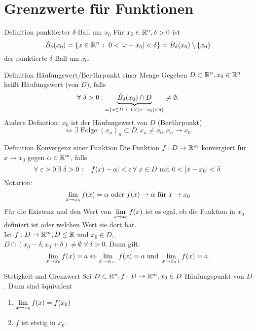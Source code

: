 \documentclass[main.tex]{subfiles}
\begin{document}
\section*{Grenzwerte für Funktionen}
\begin{karte}{Definition punktierter \(\delta\)-Ball um \(x_0\)}
    Für \( x_0 \in \mathbb{R}^n, \delta > 0 \) ist
    \[ \dot{B}_\delta(x_0) = \{ x \in \mathbb{R}^n \;\colon \; 
    0 < \left| x-x_0 \right| < \delta \} = B_\delta (x_0) \setminus 
    \{x_0\} \]
    der punktierte \( \delta \)-Ball um \( x_0 \).
\end{karte}
\begin{karte}{Definition Häufungswert/Berührpunkt einer Menge}
    Gegeben \( D \subset \mathbb{R}^n, x_0 \in \mathbb{R}^n \) heißt 
    Häufungswert (von \( D \)), falls 
    \[ \forall \, \delta > 0 : \underbrace{ 
    \dot{B}_\delta(x_0) \cap D}_{ = \set{ x\in D \;\colon \;
    0 < \abs{ x - x_0 } < \delta } } \neq \emptyset. \]
    Andere Definition:
    \( x_0 \) ist der Häufungswert von \( D \) (Berührpunkt)
    \[ \Leftrightarrow \exists \text{ Folge } {(x_n)}_n \subset D, 
    x_n \neq x_0, x_n \rightarrow x_0. \]
\end{karte}
\begin{karte}{Definition Konvergenz einer Funktion}
    Die Funktion \( f : D \rightarrow \mathbb{R}^m \) konvergiert für 
    \( x\rightarrow x_0 \) gegen \( \alpha \in \mathbb{R}^m \), falls
    \[ \forall \,\varepsilon > 0 \,\exists \, \delta > 0 
    \;\colon \; \abs{ f(x) - \alpha } < \varepsilon \,\forall \, 
    x \in D\text{ mit } 0 < \abs{x-x_0} < \delta. \]
    Notation:
    \[ \lim\limits_{x\rightarrow x_0} f(x) = \alpha \text{ oder } f(x) 
    \rightarrow \alpha \text{ für } x\rightarrow x_0 \]
    Für die Existenz und den Wert von \( \lim\limits_{x\rightarrow x_0} f(x) \)
    ist es egal, ob die Funktion in \( x_0 \) definiert ist oder welchen 
    Wert sie dort hat. \\
    Ist \( f: D \rightarrow \mathbb{R}^m, D \leq \mathbb{R} \) und \( x_0 \in D \),\\
    \( D \cap (x_0 - \delta, x_0 + \delta) \neq \emptyset \;\forall \, 
    \delta > 0 \). Dann gilt: 
    \[ \lim\limits_{x\rightarrow x_0} f(x) = a \Leftrightarrow
    \lim\limits_{x\rightarrow x_0-} f(x) = a \text{ und } \lim\limits_{x\rightarrow x_0+} 
    f(x) = a. \]
\end{karte}
\begin{karte}{Stetigkeit und Grenzwert}
    Sei \( D \subset \mathbb{R}^n, f : D \rightarrow \mathbb{R}^m, x_0 \in D \) 
    Häufungspunkt von \(D\). Dann sind äquivalent
    \begin{enumerate}
        \item \( \lim\limits_{x\rightarrow x_0} f(x) = f(x_0) \)
        \item \( f \) ist stetig in \( x_0 \).
    \end{enumerate}
\end{karte}
\end{document}
